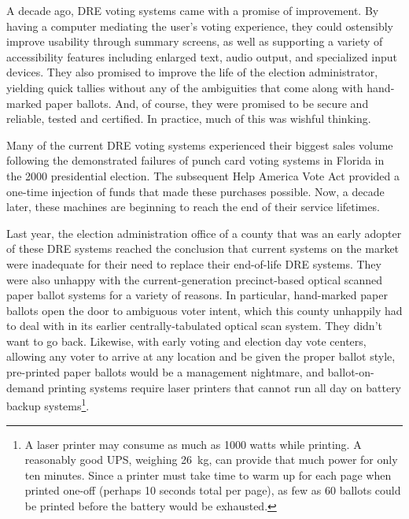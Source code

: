 \label{sec:intro}

A decade ago, DRE voting systems came with a promise of improvement. By having a
computer mediating the user's voting experience, they could ostensibly
improve usability through summary screens, as well as supporting a
variety of accessibility features including enlarged text, audio
output, and specialized input devices. They also promised to improve
the life of the election administrator, yielding quick tallies without
any of the ambiguities that come along with hand-marked paper ballots.
And, of course, they were promised to be secure and reliable, tested
and certified. In practice, much of this was wishful thinking.

Many of the current DRE voting systems experienced their biggest sales
volume following the demonstrated failures of punch card voting
systems in Florida in the 2000 presidential election. The subsequent Help America Vote Act
provided a one-time injection of funds that made these purchases
possible. Now, a decade later, these machines are beginning to reach the end of
their service lifetimes. 

Last year, the election administration office of a county that was an
early adopter of these DRE systems reached the conclusion that current
systems on the market were inadequate for their need to replace their
end-of-life DRE systems. They were also unhappy with the
current-generation precinct-based optical scanned paper ballot systems
for a variety of reasons. In particular, hand-marked paper ballots
open the door to ambiguous voter intent, which this county unhappily
had to deal with in its earlier centrally-tabulated optical scan
system. They didn't want to go back. Likewise, with early
voting and election day vote centers, allowing any voter to arrive at
any location and be given the proper ballot style, pre-printed paper ballots would
be a management nightmare, and ballot-on-demand printing systems
require laser printers that cannot run all day on battery backup
systems\footnote{A laser printer may consume as much as 1000 watts
  while printing. A reasonably good UPS, weighing 26~kg, can provide
  that much power for only ten minutes. Since a printer must take time
  to warm up for each page when printed one-off (perhaps 10
  seconds total per page), as few as 60 ballots could be printed before the
  battery would be exhausted.}.

